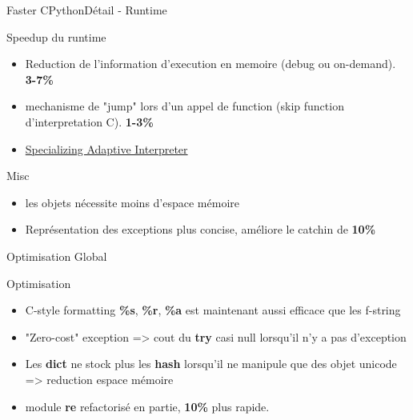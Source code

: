 \documentclass[aspectratio=169, xetex, 12pt]{beamer}
\begin{document}
    \begin{frame}{Faster CPython}{Détail - Runtime}
        \begin{block}{Speedup du runtime}
            \begin{itemize}
                \item Reduction de l'information d'execution en memoire (debug ou on-demand). \textbf{3-7\%}
                \item mechanisme de "jump" lors d'un appel de function (skip function d'interpretation C). \textbf{1-3\%}
                \item \href{https://github.com/brandtbucher/specialist}{Specializing Adaptive Interpreter}
            \end{itemize}
        \end{block}
        \begin{block}{Misc}
            \begin{itemize}
                \item les objets nécessite moins d'espace mémoire
                \item Représentation des exceptions plus concise, améliore le catchin de \textbf{10\%}
            \end{itemize}
        \end{block}
    \end{frame}

    \begin{frame}{Optimisation Global}
        \begin{block}{Optimisation}
            \begin{itemize}
                \item C-style formatting \textbf{\%s}, \textbf{\%r}, \textbf{\%a} est maintenant aussi efficace que les f-string
                \item "Zero-cost" exception => cout du \textbf{try} casi null lorsqu'il n'y a pas d'exception
                \item Les \textbf{dict} ne stock plus les \textbf{hash} lorsqu'il ne manipule que des objet unicode => reduction espace mémoire
                \item module \textbf{re} refactorisé en partie, \textbf{10\%} plus rapide.
            \end{itemize}
        \end{block}
    \end{frame}
\end{document}
